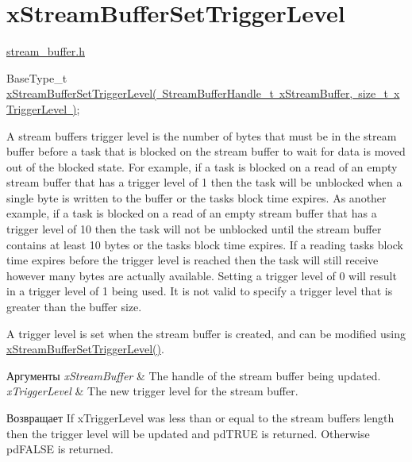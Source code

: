 \hypertarget{group__x_stream_buffer_set_trigger_level}{}\section{x\+Stream\+Buffer\+Set\+Trigger\+Level}
\label{group__x_stream_buffer_set_trigger_level}
\mbox{\hyperlink{stream__buffer_8h}{stream\+\_\+buffer.\+h}}


\begin{DoxyPre}
BaseType\_t \mbox{\hyperlink{stream__buffer_8h_a28f0280587c76e71efeaa8f415ebde04}{xStreamBufferSetTriggerLevel( StreamBufferHandle\_t xStreamBuffer, size\_t xTriggerLevel )}};
\end{DoxyPre}


A stream buffer\textquotesingle{}s trigger level is the number of bytes that must be in the stream buffer before a task that is blocked on the stream buffer to wait for data is moved out of the blocked state. For example, if a task is blocked on a read of an empty stream buffer that has a trigger level of 1 then the task will be unblocked when a single byte is written to the buffer or the task\textquotesingle{}s block time expires. As another example, if a task is blocked on a read of an empty stream buffer that has a trigger level of 10 then the task will not be unblocked until the stream buffer contains at least 10 bytes or the task\textquotesingle{}s block time expires. If a reading task\textquotesingle{}s block time expires before the trigger level is reached then the task will still receive however many bytes are actually available. Setting a trigger level of 0 will result in a trigger level of 1 being used. It is not valid to specify a trigger level that is greater than the buffer size.

A trigger level is set when the stream buffer is created, and can be modified using \mbox{\hyperlink{stream__buffer_8h_a28f0280587c76e71efeaa8f415ebde04}{x\+Stream\+Buffer\+Set\+Trigger\+Level()}}.


\begin{DoxyParams}{Аргументы}
{\em x\+Stream\+Buffer} & The handle of the stream buffer being updated.\\
\hline
{\em x\+Trigger\+Level} & The new trigger level for the stream buffer.\\
\hline
\end{DoxyParams}
\begin{DoxyReturn}{Возвращает}
If x\+Trigger\+Level was less than or equal to the stream buffer\textquotesingle{}s length then the trigger level will be updated and pd\+T\+R\+UE is returned. Otherwise pd\+F\+A\+L\+SE is returned. 
\end{DoxyReturn}
